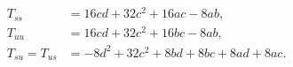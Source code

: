 \begin{align}
T_{ss}&=16cd+32c^{2}+16ac-8ab,\\
T_{uu}&=16cd+32c^{2}+16bc-8ab,\\
T_{su}=T_{us}&=-8d^{2}+32c^{2}+8bd+8bc+8ad+8ac.
\end{align}
